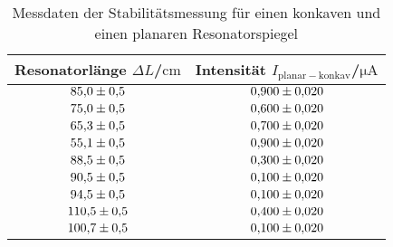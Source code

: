 \begin{table}
 \caption{Messdaten der Stabilitätsmessung für einen konkaven und einen planaren Resonatorspiegel}
 \label{tab:stabilitaetpk}
 \centering
{} \begin{tabular}{SS}
 \toprule 
    {Resonatorlänge $\Delta L$/$\si{\centi\meter}$}& {Intensität $I_{\mathrm{planar-konkav}}$/$\si{\micro\ampere}$} \\
     \midrule
     $\num{85.0 \pm 0.5}$ & $\num{0.900\pm0.020}$ \\
     $\num{75.0 \pm 0.5}$ & $\num{0.600\pm0.020}$ \\
     $\num{65.3 \pm 0.5}$ & $\num{0.700\pm0.020}$ \\
     $\num{55.1 \pm 0.5}$ & $\num{0.900\pm0.020}$ \\
     $\num{88.5 \pm 0.5}$ & $\num{0.300\pm0.020}$ \\
     $\num{90.5 \pm 0.5}$ & $\num{0.100\pm0.020}$ \\
     $\num{94.5 \pm 0.5}$ & $\num{0.100\pm0.020}$ \\
     $\num{110.5 \pm 0.5}$ & $\num{0.400\pm0.020}$ \\
     $\num{100.7 \pm 0.5}$ & $\num{0.100\pm0.020}$ \\
 \bottomrule
 \end{tabular}
\end{table}